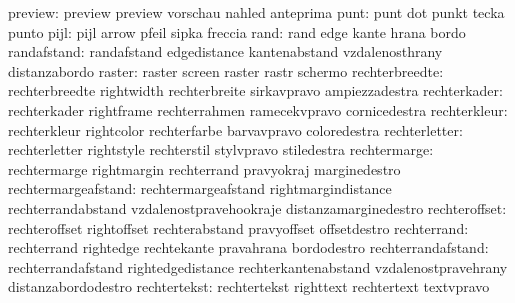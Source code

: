                   preview: preview                   preview
                           vorschau                  nahled
                           anteprima
                     punt: punt                      dot
                           punkt                     tecka
                           punto
                     pijl: pijl                      arrow
                           pfeil                     sipka
                           freccia
                     rand: rand                      edge
                           kante                     hrana
                           bordo
              randafstand: randafstand               edgedistance
                           kantenabstand             vzdalenosthrany
                           distanzabordo
                   raster: raster                    screen
                           raster                    rastr
                           schermo
           rechterbreedte: rechterbreedte            rightwidth
                           rechterbreite             sirkavpravo
                           ampiezzadestra
             rechterkader: rechterkader              rightframe
                           rechterrahmen             ramecekvpravo
                           cornicedestra
             rechterkleur: rechterkleur              rightcolor
                           rechterfarbe              barvavpravo
                           coloredestra
            rechterletter: rechterletter             rightstyle
                           rechterstil               stylvpravo
                           stiledestra
             rechtermarge: rechtermarge              rightmargin
                           rechterrand               pravyokraj
                           marginedestro
      rechtermargeafstand: rechtermargeafstand       rightmargindistance
                           rechterrandabstand        vzdalenostpravehookraje
                           distanzamarginedestro
            rechteroffset: rechteroffset             rightoffset
                           rechterabstand            pravyoffset
                           offsetdestro
              rechterrand: rechterrand               rightedge
                           rechtekante               pravahrana
                           bordodestro
       rechterrandafstand: rechterrandafstand        rightedgedistance
                           rechterkantenabstand      vzdalenostpravehrany
                           distanzabordodestro
             rechtertekst: rechtertekst              righttext
                           rechtertext               textvpravo
